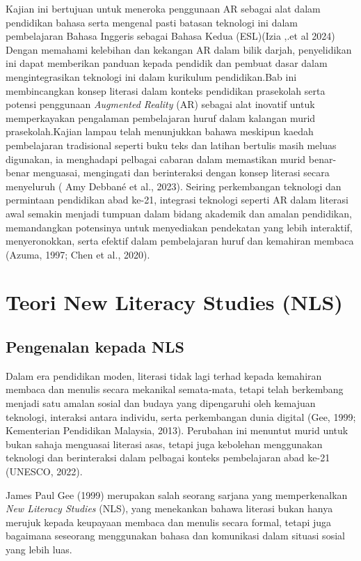 \hspace{1cm}Kajian ini bertujuan untuk meneroka penggunaan AR sebagai alat dalam pendidikan bahasa serta mengenal pasti batasan teknologi ini dalam pembelajaran Bahasa Inggeris sebagai Bahasa Kedua (ESL)(Izia ,.et al 2024)  Dengan memahami kelebihan dan kekangan AR dalam bilik darjah, penyelidikan ini dapat memberikan panduan kepada pendidik dan pembuat dasar dalam mengintegrasikan teknologi ini dalam kurikulum pendidikan.Bab ini membincangkan konsep literasi dalam konteks pendidikan prasekolah serta potensi penggunaan \textit{Augmented Reality }(AR) sebagai alat inovatif untuk memperkayakan pengalaman pembelajaran huruf dalam kalangan murid prasekolah.Kajian lampau telah menunjukkan bahawa meskipun kaedah pembelajaran tradisional seperti buku teks dan latihan bertulis masih meluas digunakan, ia menghadapi pelbagai cabaran dalam memastikan murid benar-benar menguasai, mengingati dan berinteraksi dengan konsep literasi secara menyeluruh ( Amy Debbané  et al., 2023). Seiring perkembangan teknologi dan permintaan pendidikan abad ke-21, integrasi teknologi seperti AR dalam literasi awal semakin menjadi tumpuan dalam bidang akademik dan amalan pendidikan, memandangkan potensinya untuk menyediakan pendekatan yang lebih interaktif, menyeronokkan, serta efektif dalam pembelajaran huruf dan kemahiran membaca (Azuma, 1997; Chen et al., 2020).

\section{Teori New Literacy Studies (NLS)}

\subsection{Pengenalan kepada NLS}
Dalam era pendidikan moden, literasi tidak lagi terhad kepada kemahiran membaca dan menulis secara mekanikal semata-mata, tetapi telah berkembang menjadi satu amalan sosial dan budaya yang dipengaruhi oleh kemajuan teknologi, interaksi antara individu, serta perkembangan dunia digital (Gee, 1999; Kementerian Pendidikan Malaysia, 2013). Perubahan ini menuntut murid untuk bukan sahaja menguasai literasi asas, tetapi juga kebolehan menggunakan teknologi dan berinteraksi dalam pelbagai konteks pembelajaran abad ke-21 (UNESCO, 2022).

\hspace{1cm}James Paul Gee (1999) merupakan salah seorang sarjana yang memperkenalkan \textit{New Literacy Studies} (NLS), yang menekankan bahawa literasi bukan hanya merujuk kepada keupayaan membaca dan menulis secara formal, tetapi juga bagaimana seseorang menggunakan bahasa dan komunikasi dalam situasi sosial yang lebih luas.

